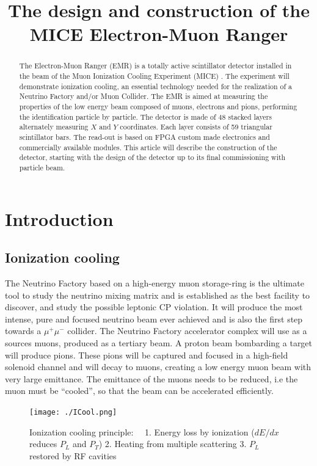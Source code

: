 \documentclass[a4paper,11pt]{article}
\title{The design and construction of the MICE Electron-Muon Ranger}
\author{}
\begin{document}
\maketitle

\begin{abstract}
The Electron-Muon Ranger (EMR) is a totally active scintillator detector installed in the beam of the Muon Ionization
Cooling Experiment (MICE) \cite{MICEweb}. The experiment will demonstrate ionization cooling, an essential technology needed
for the realization of a Neutrino Factory and/or Muon Collider. The EMR is aimed at measuring the properties of the low
energy beam composed of muons, electrons and pions, performing the identification particle by particle. The detector is
made of 48 stacked layers alternately measuring $X$ and $Y$ coordinates. Each layer consists of 59 triangular scintillator
bars. The read-out is based on FPGA custom made electronics and commercially available modules. This article will describe
the construction of the detector, starting with the design of the detector up to its final commissioning with particle beam.
\end{abstract}

\section{Introduction}
\subsection{Ionization cooling}
The Neutrino Factory based on a high-energy muon storage-ring is the ultimate tool to study the neutrino mixing matrix
and is established as the best facility to discover, and study the possible leptonic CP violation. It will produce the
most intense, pure and focused neutrino beam ever achieved and is also the first step towards a $\mu^+ \mu^-$ collider.
The Neutrino Factory accelerator complex will use as a sources muons, produced as a tertiary beam. A proton beam bombarding
a target will produce pions. These pions will be captured and focused in a high-field solenoid channel and will decay
to muons, creating a low energy muon beam with very large emittance.  The emittance of the muons needs to be reduced,
i.e the muon must be “cooled”, so that the beam can be accelerated efficiently.

\begin{figure}[htb]
 \texttt{[image: ./ICool.png]}
 \caption{Ionization cooling principle: \ \ 1. Energy loss by ionization ($dE/dx$ reduces $P_L$ and $P_T$)
    2. Heating from multiple scattering
    3. $P_L$ restored by RF cavities    
   }
 \label{icool}     
\end{figure}
\end{document}

